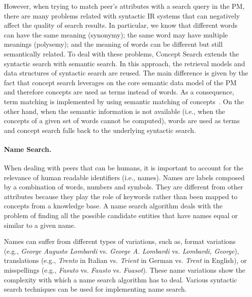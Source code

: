 However, when trying to match peer's attributes with a search query in the PM, there are many problems related with syntactic IR systems that can negatively affect the quality of search results. In particular, we know that different words can have the same meaning (synonymy); the same word may have multiple meanings (polysemy); and the meaning of words can be different but still semantically related. To deal with these problems, Concept Search extends the syntactic search with semantic search. In this approach, the retrieval models and data structures of syntactic search are reused. The main difference is given by the fact that concept search leverages on the core semantic data model of the PM and therefore concepts are used as terms instead of words. As a consequence, term matching is implemented by using semantic matching of concepts~\cite{Giunchiglia:2007ve}. On the other hand, when the semantic information is not available (i.e., when the concepts of a given set of words cannot be computed), words are used as terms and concept search falls back to the underlying syntactic search.


\paragraph{Name Search.} 
\label{par:name_search}
When dealing with peers that can be humans, it is important to account for the relevance of human readable identifiers (i.e., names). 
Names are labels composed by a combination of words, numbers and symbols. They are different from other attributes because they play the role of keywords rather than been mapped to concepts from a knowledge base. 
A name search algorithm deals with the problem of finding all the possible candidate entities that have names equal or similar to a given name.


Names can suffer from different types of variations, such as, format variations (e.g., \emph{George Augusto Lombardi} vs. \emph{George A. Lombardi} vs. \emph{Lombardi, George}), translations (e.g., \emph{Trento} in Italian vs. \emph{Trient} in German vs. \emph{Trent} in English), or misspellings (e.g., \emph{Fasuto} vs. \emph{Fausto} vs. \emph{Fuasot}). These name variations show the complexity with which a name search algorithm has to deal. Various syntactic search techniques can be used for implementing name search. 


